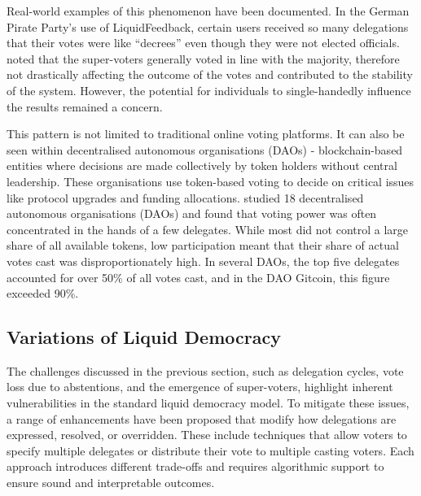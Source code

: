 Real-world examples of this phenomenon have been documented. In the German Pirate Party's use of LiquidFeedback, certain users received so many delegations that their votes were like ``decrees'' \citep{sven_becker_liquid_2012,kling2015votingbehaviourpoweronline} even though they were not elected officials. \cite{kling2015votingbehaviourpoweronline} noted that the super-voters generally voted in line with the majority, therefore not drastically affecting the outcome of the votes and contributed to the stability of the system. However, the potential for individuals to single-handedly influence the results remained a concern.

This pattern is not limited to traditional online voting platforms. It can also be seen within decentralised autonomous organisations (DAOs) - blockchain-based entities where decisions are made collectively by token holders without central leadership. These organisations use token-based voting to decide on critical issues like protocol upgrades and funding allocations. \cite{hallWhatHappensWhen2024} studied 18 decentralised autonomous organisations (DAOs) and found that voting power was often concentrated in the hands of a few delegates. While most did not control a large share of all available tokens, low participation meant that their share of actual votes cast was disproportionately high. In several DAOs, the top five delegates accounted for over 50\% of all votes cast, and in the DAO Gitcoin, this figure exceeded 90\%.

\subsection{Variations of Liquid Democracy}
The challenges discussed in the previous section, such as delegation cycles, vote loss due to abstentions, and the emergence of super-voters, highlight inherent vulnerabilities in the standard liquid democracy model. To mitigate these issues, a range of enhancements have been proposed that modify how delegations are expressed, resolved, or overridden. These include techniques that allow voters to specify multiple delegates or distribute their vote to multiple casting voters. Each approach introduces different trade-offs and requires algorithmic support to ensure sound and interpretable outcomes.

